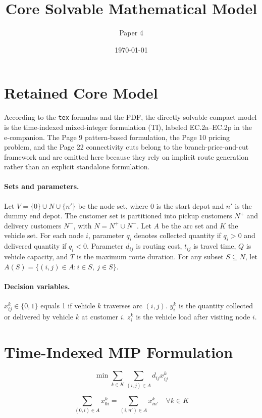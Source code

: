 \documentclass{article}
\title{Core Solvable Mathematical Model}
\author{Paper 4}
\date{\today}
\begin{document}
\maketitle

\section*{Retained Core Model}
According to the \texttt{tex} formulas and the PDF, the directly solvable compact model is the
time-indexed mixed-integer formulation (TI), labeled EC.2a--EC.2p in the e-companion. The
Page 9 pattern-based formulation, the Page 10 pricing problem, and the Page 22 connectivity
cuts belong to the branch-price-and-cut framework and are omitted here because they rely on
implicit route generation rather than an explicit standalone formulation.

\paragraph{Sets and parameters.}
Let $V=\{0\}\cup N \cup \{n'\}$ be the node set, where $0$ is the start depot and $n'$ is the
dummy end depot. The customer set is partitioned into pickup customers $N^{+}$ and delivery
customers $N^{-}$, with $N=N^{+}\cup N^{-}$. Let $A$ be the arc set and $K$ the vehicle set.
For each node $i$, parameter $q_i$ denotes collected quantity if $q_i>0$ and delivered quantity
if $q_i<0$. Parameter $d_{ij}$ is routing cost, $t_{ij}$ is travel time, $Q$ is vehicle capacity,
and $T$ is the maximum route duration. For any subset $S \subseteq N$, let
$A(S)=\{(i,j)\in A : i \in S,\ j \in S\}$.

\paragraph{Decision variables.}
$x_{ij}^{k}\in\{0,1\}$ equals 1 if vehicle $k$ traverses arc $(i,j)$.
$y_i^k$ is the quantity collected or delivered by vehicle $k$ at customer $i$.
$z_i^k$ is the vehicle load after visiting node $i$.

\section*{Time-Indexed MIP Formulation}
\begin{equation}
\min \sum_{k \in K} \sum_{(i,j) \in A} d_{ij} x_{ij}^{k}
\tag{EC.2a}
\end{equation}

\begin{equation}
\sum_{(0,i) \in A} x_{0i}^{k} = \sum_{(i,n') \in A} x_{in'}^{k}
\quad \forall k \in K
\tag{EC.2b}
\end{equation}
\end{document}
